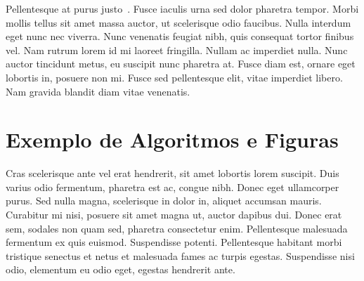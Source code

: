 Pellentesque at purus justo~\cite{Huetal2000}. Fusce iaculis urna sed dolor pharetra tempor. Morbi mollis tellus sit amet massa auctor, ut scelerisque odio faucibus. Nulla interdum eget nunc nec viverra. Nunc venenatis feugiat nibh, quis consequat tortor finibus vel. Nam rutrum lorem id mi laoreet fringilla. Nullam ac imperdiet nulla. Nunc auctor tincidunt metus, eu suscipit nunc pharetra at. Fusce diam est, ornare eget lobortis in, posuere non mi. Fusce sed pellentesque elit, vitae imperdiet libero. Nam gravida blandit diam vitae venenatis.

\section{Exemplo de Algoritmos e Figuras}
\label{sec:exemplo-de-algoritmos-e-figuras}

Cras scelerisque ante vel erat hendrerit, sit amet lobortis lorem suscipit. Duis varius odio fermentum, pharetra est ac, congue nibh. Donec eget ullamcorper purus. Sed nulla magna, scelerisque in dolor in, aliquet accumsan mauris. Curabitur mi nisi, posuere sit amet magna ut, auctor dapibus dui. Donec erat sem, sodales non quam sed, pharetra consectetur enim. Pellentesque malesuada fermentum ex quis euismod. Suspendisse potenti. Pellentesque habitant morbi tristique senectus et netus et malesuada fames ac turpis egestas. Suspendisse nisi odio, elementum eu odio eget, egestas hendrerit ante.

\begin{algorithm}[ht!]
	\SetSpacedAlgorithm
	\caption{\label{exemplo-de-algoritmo}Como escrever algoritmos no \LaTeX2e}
\end{algorithm}

